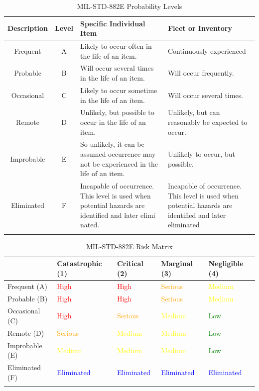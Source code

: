 \documentclass{article}
\begin{document}
\begin{table}[h]
    \begin{tabularx}{\linewidth}{c | c | X | X}
        Description & Level & Specific Individual Item & Fleet or Inventory \\ \hline
        Frequent & A & Likely to occur often in the life of an item. & Continuously experienced \\
        Probable & B & Will occur several times in the life of an item. & Will occur frequently. \\
        Occasional & C & Likely to occur sometime in the life of an item. & Will occur several times. \\
        Remote & D & Unlikely, but possible to occur in the life of an item. & Unlikely, but can reasonably be expected to occur. \\
        Improbable & E & So unlikely, it can be assumed occurrence may not be experienced in the life of an item. & Unlikely to occur, but possible. \\
        Eliminated & F & Incapable of occurrence. This level is used when potential hazards are identified and later elimi nated. & Incapable of occurrence. This level is used when potential hazards are identified and later eliminated \\
    \caption{MIL-STD-882E Probability Levels \citep{department_of_defense_mil-std-882e_2012}}
    \end{tabularx}
    \label{department_of_defense_mil-std-882e_2012_probability_levels}
\end{table}

\begin{table}[p]
    \begin{tabularx}{\linewidth}{ X | X | X | X | X}
        & Catastrophic (1) & Critical (2) & Marginal (3) & Negligible (4) \\ \hline
        Frequent (A) & \textcolor{red}{High} & \textcolor{red}{High} & \textcolor{orange}{Serious} & \textcolor{yellow}{Medium} \\
        Probable (B) & \textcolor{red}{High} & \textcolor{red}{High} & \textcolor{orange}{Serious} & \textcolor{yellow}{Medium} \\
        Occasional (C) & \textcolor{red}{High} & \textcolor{orange}{Serious} & \textcolor{yellow}{Medium} & \textcolor{green}{Low} \\
        Remote (D) & \textcolor{orange}{Serious} & \textcolor{yellow}{Medium} & \textcolor{yellow}{Medium} & \textcolor{green}{Low} \\
        Improbable (E) & \textcolor{yellow}{Medium} & \textcolor{yellow}{Medium} & \textcolor{yellow}{Medium} & \textcolor{green}{Low} \\
        Eliminated (F) & \textcolor{blue}{Eliminated} & \textcolor{blue}{Eliminated} & \textcolor{blue}{Eliminated} & \textcolor{blue}{Eliminated} \\
    \caption{MIL-STD-882E Risk Matrix \citep{department_of_defense_mil-std-882e_2012}}
    \end{tabularx}
    \label{department_of_defense_mil-std-882e_2012_risk_matrix}
\end{table}
\end{document}
